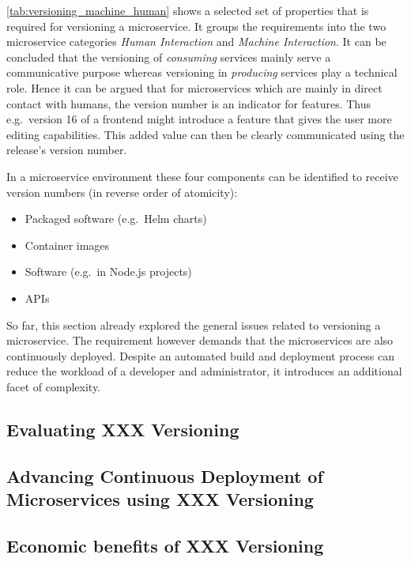 
\ref{tab:versioning_machine_human} shows a selected set of properties that is
required for versioning a microservice. It groups the requirements into the two
microservice categories \textit{Human Interaction} and \textit{Machine
Interaction}. It can be concluded that the versioning of \textit{consuming}
services mainly serve a communicative purpose whereas versioning in
\textit{producing} services play a technical role. Hence it can be argued that
for microservices which are mainly in direct contact with humans, the version
number is an indicator for features. Thus e.g.\ version 16 of a frontend might
introduce a feature that gives the user more editing capabilities. This added
value can then be clearly communicated using the release's version number.

In a microservice environment these four components can be identified to
receive version numbers (in reverse order of atomicity):
\begin{itemize}
  \item Packaged software (e.g.\ Helm charts)
  \item Container images
  \item Software (e.g.\ in Node.js projects)
  \item \acp{API}
\end{itemize}

So far, this section already explored the general issues related to versioning
a microservice. The requirement however demands that the microservices are also
continuously deployed. Despite an automated build and deployment process can
reduce the workload of a developer and administrator, it introduces an
additional facet of complexity.

\subsection{Evaluating XXX Versioning}%
\label{sub:Evaluating_XXX_Versioning}

\subsection{Advancing Continuous Deployment of Microservices using XXX Versioning}%
\label{sub:Advancing_Continuous_Deployment_of_Microservices_using_XXX_Versioning}

\subsection{Economic benefits of XXX Versioning}%
\label{sub:Economic_benefits_of_XXX_Versioning}

